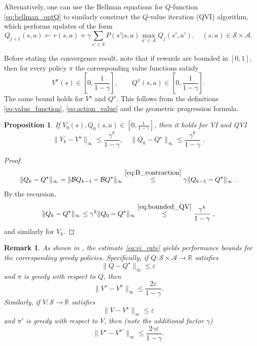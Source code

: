 \documentclass{article}
\numberwithin{equation}{section}
\newtheorem{proposition}{Proposition}
\newtheorem{remark}{Remark}
\newcommand{\R}{\mathbb{R}}
\newcommand{\cA}{\mathcal{A}}
\newcommand{\cS}{\mathcal{S}}
\newcommand{\eqsp}{\;}
\begin{document}
Alternatively, one can use the Bellman equations for $Q$-function \eqref{eq:bellman_optQ} to similarly construct the $Q$-value iteration (QVI) algorithm, which performs updates of the form
\begin{equation}\label{eq:qvi}
    Q_{j+1}(s,a) \gets r(s,a) + \gamma \sum_{s'\in\cS} P(s'|s,a) \max_{a'\in\cA} Q_{j}(s',a'), \quad (s,a)\in\cS\times\cA.
\end{equation}

Before stating the convergence result, note that if rewards are bounded in $[0,1]$, then for every policy $\pi$ the corresponding value functions satisfy
\begin{equation}\label{eq:bounded_QV}
    V^\pi(s) \in \left[0,\frac{1}{1-\gamma}\right],\qquad
    Q^\pi(s,a) \in \left[0,\frac{1}{1-\gamma}\right].
\end{equation}
The same bound holds for \(V^\star\) and \(Q^\star\).
This follows from the definitions \eqref{eq:value_function}, \eqref{eq:action_value} and the geometric progression formula.
\begin{proposition}
    If $V_0(s),Q_0(s,a) \in \left[0,\frac{1}{1-\gamma}\right]$, then it holds for VI and QVI
    \begin{equation}\label{eq:vi_rate}
    \|V_k - V^{\star}\|_{\infty} \leq \frac{\gamma^k}{1-\gamma},\quad \|Q_k - {Q}^{\star}\|_{\infty} \leq \frac{\gamma^k}{1-\gamma}\eqsp.
    \end{equation}
\end{proposition}
\begin{proof}
    \[
    \|Q_k - {Q}^{\star}\|_{\infty} = \|{\mathcal{B}}Q_{k-1} - {\mathcal{B}}{Q}^{\star}\|_{\infty} \stackrel{\eqref{eq:B_contraction}}{\leq} \gamma \|Q_{k-1} - {Q}^{\star}\|_{\infty}\eqsp.
    \]
    By the recursion,
    \[
    \|Q_k - {Q}^{\star}\|_{\infty} \leq \gamma^k \|Q_0 - {Q}^{\star}\|_{\infty} \stackrel{\eqref{eq:bounded_QV}}{\leq} \frac{\gamma^k}{1-\gamma}\eqsp,
    \]
    and similarly for $V_k$.
\end{proof}
\begin{remark}
As shown in \citep{singh1994upper}, the estimate \eqref{eq:vi_rate} yields performance bounds for the corresponding greedy policies. Specifically, if \(Q:\cS\times\cA\to\R\) satisfies
\[
\|Q-Q^\star\|_\infty \le \varepsilon
\]
and \(\pi\) is greedy with respect to \(Q\), then
\[
\|V^\star - V^\pi\|_\infty \le \frac{2\varepsilon}{1-\gamma}.
\]
Similarly, if \(V:\cS\to\R\) satisfies
\[
\|V-V^\star\|_\infty \le \varepsilon
\]
and \(\pi'\) is greedy with respect to \(V\), then (note the additional factor $\gamma$)
\[
\|V^\star - V^{\pi'}\|_\infty \le \frac{2\gamma\varepsilon}{1-\gamma}.
\]
\end{remark}
\end{document}
